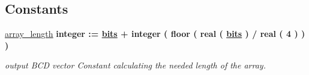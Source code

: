 \subsection*{Constants}
 \begin{DoxyCompactItemize}
\item 
\hypertarget{classbin2bcd_1_1converter_a0cc376987d43bd9d544cbaede089b0cf}{\hyperlink{classbin2bcd_1_1converter_a0cc376987d43bd9d544cbaede089b0cf}{array\-\_\-length} {\bfseries \textcolor{comment}{integer}\textcolor{vhdlchar}{ }\textcolor{vhdlchar}{ }\textcolor{vhdlchar}{\-:}\textcolor{vhdlchar}{=}\textcolor{vhdlchar}{ }{\bfseries \hyperlink{classbin2bcd_a03ce448558c2218cb8d7efccef340e15}{bits}} \textcolor{vhdlchar}{ }\textcolor{vhdlchar}{+}\textcolor{vhdlchar}{ }\textcolor{comment}{integer}\textcolor{vhdlchar}{ }\textcolor{vhdlchar}{(}\textcolor{vhdlchar}{ }\textcolor{vhdlchar}{ }\textcolor{vhdlchar}{floor}\textcolor{vhdlchar}{ }\textcolor{vhdlchar}{(}\textcolor{vhdlchar}{ }\textcolor{vhdlchar}{ }\textcolor{comment}{real}\textcolor{vhdlchar}{ }\textcolor{vhdlchar}{(}\textcolor{vhdlchar}{ }\textcolor{vhdlchar}{ }{\bfseries \hyperlink{classbin2bcd_a03ce448558c2218cb8d7efccef340e15}{bits}} \textcolor{vhdlchar}{ }\textcolor{vhdlchar}{)}\textcolor{vhdlchar}{ }\textcolor{vhdlchar}{ }\textcolor{vhdlchar}{/}\textcolor{vhdlchar}{ }\textcolor{comment}{real}\textcolor{vhdlchar}{ }\textcolor{vhdlchar}{(}\textcolor{vhdlchar}{ }\textcolor{vhdlchar}{ } \textcolor{vhdldigit}{4} \textcolor{vhdlchar}{ }\textcolor{vhdlchar}{)}\textcolor{vhdlchar}{ }\textcolor{vhdlchar}{ }\textcolor{vhdlchar}{)}\textcolor{vhdlchar}{ }\textcolor{vhdlchar}{ }\textcolor{vhdlchar}{)}\textcolor{vhdlchar}{ }} }\label{classbin2bcd_1_1converter_a0cc376987d43bd9d544cbaede089b0cf}

\begin{DoxyCompactList}\small\item\em output B\-C\-D vector Constant calculating the needed length of the array. \end{DoxyCompactList}\end{DoxyCompactItemize}
